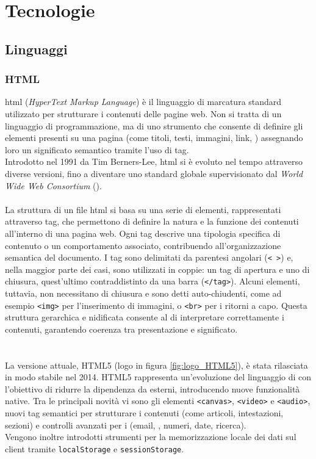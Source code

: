 \chapter{Tecnologie}
\label{chap:linguaggi-tecnologie}

\section{Linguaggi}
\subsection{HTML}
\label{subsec:html}
\noindent \acrshort{html} (\textit{HyperText Markup Language}) è il linguaggio di marcatura standard utilizzato per strutturare i contenuti delle pagine web. Non si tratta di un linguaggio di programmazione, ma di uno strumento che consente di definire gli elementi presenti su una pagina (come titoli, testi, immagini, link, ) assegnando loro un significato semantico tramite l’uso di tag. \\
Introdotto nel 1991 da Tim Berners-Lee, \acrshort{html} si è evoluto nel tempo attraverso diverse versioni, fino a diventare uno standard globale supervisionato dal \textit{World Wide Web Consortium} ().\\
\\
La struttura di un file \acrshort{html} si basa su una serie di elementi, rappresentati attraverso tag, che permettono di definire la natura e la funzione dei contenuti all'interno di una pagina web. Ogni tag descrive una tipologia specifica di contenuto o un comportamento associato, contribuendo all'organizzazione semantica del documento. I tag sono delimitati da parentesi angolari (\texttt{< >}) e, nella maggior parte dei casi, sono utilizzati in coppie: un tag di apertura e uno di chiusura, quest’ultimo contraddistinto da una barra (\texttt{</tag>}). Alcuni elementi, tuttavia, non necessitano di chiusura e sono detti auto-chiudenti, come ad esempio \texttt{<img>} per l’inserimento di immagini, o \texttt{<br>} per i ritorni a capo. Questa struttura gerarchica e nidificata consente al  di interpretare correttamente i contenuti, garantendo coerenza tra presentazione e significato.\\
\\\\
La versione attuale, HTML5 (logo in figura \ref{fig:logo_HTML5}), è stata rilasciata in modo stabile nel 2014.
HTML5 rappresenta un’evoluzione del linguaggio di  con l’obiettivo di ridurre la dipendenza da  esterni, introducendo nuove funzionalità native. Tra le principali novità vi sono gli elementi \texttt{<canvas>}, \texttt{<video>} e \texttt{<audio>}, nuovi tag semantici per strutturare i contenuti (come articoli, intestazioni, sezioni) e controlli avanzati per i  (email, , numeri, date, ricerca). 
\\Vengono inoltre introdotti strumenti per la memorizzazione locale dei dati sul client tramite \texttt{localStorage} e \texttt{sessionStorage}.

